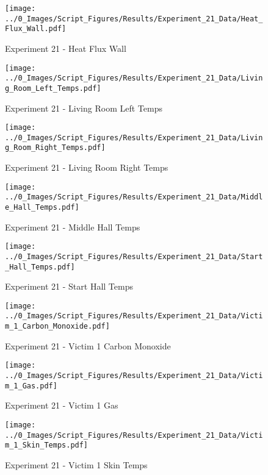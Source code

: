 	\begin{figure}[H]
		\centering
		\texttt{[image: ../0\_Images/Script\_Figures/Results/Experiment\_21\_Data/Heat\_Flux\_Wall.pdf]}
		\caption[]{Experiment 21 - Heat Flux Wall}
	\end{figure}
 
	\clearpage

	\begin{figure}[H]
		\centering
		\texttt{[image: ../0\_Images/Script\_Figures/Results/Experiment\_21\_Data/Living\_Room\_Left\_Temps.pdf]}
		\caption[]{Experiment 21 - Living Room Left Temps}
	\end{figure}
 

	\begin{figure}[H]
		\centering
		\texttt{[image: ../0\_Images/Script\_Figures/Results/Experiment\_21\_Data/Living\_Room\_Right\_Temps.pdf]}
		\caption[]{Experiment 21 - Living Room Right Temps}
	\end{figure}
 
	\clearpage

	\begin{figure}[H]
		\centering
		\texttt{[image: ../0\_Images/Script\_Figures/Results/Experiment\_21\_Data/Middle\_Hall\_Temps.pdf]}
		\caption[]{Experiment 21 - Middle Hall Temps}
	\end{figure}
 

	\begin{figure}[H]
		\centering
		\texttt{[image: ../0\_Images/Script\_Figures/Results/Experiment\_21\_Data/Start\_Hall\_Temps.pdf]}
		\caption[]{Experiment 21 - Start Hall Temps}
	\end{figure}
 
	\clearpage

	\begin{figure}[H]
		\centering
		\texttt{[image: ../0\_Images/Script\_Figures/Results/Experiment\_21\_Data/Victim\_1\_Carbon\_Monoxide.pdf]}
		\caption[]{Experiment 21 - Victim 1 Carbon Monoxide}
	\end{figure}
 

	\begin{figure}[H]
		\centering
		\texttt{[image: ../0\_Images/Script\_Figures/Results/Experiment\_21\_Data/Victim\_1\_Gas.pdf]}
		\caption[]{Experiment 21 - Victim 1 Gas}
	\end{figure}
 
	\clearpage

	\begin{figure}[H]
		\centering
		\texttt{[image: ../0\_Images/Script\_Figures/Results/Experiment\_21\_Data/Victim\_1\_Skin\_Temps.pdf]}
		\caption[]{Experiment 21 - Victim 1 Skin Temps}
	\end{figure}
 

